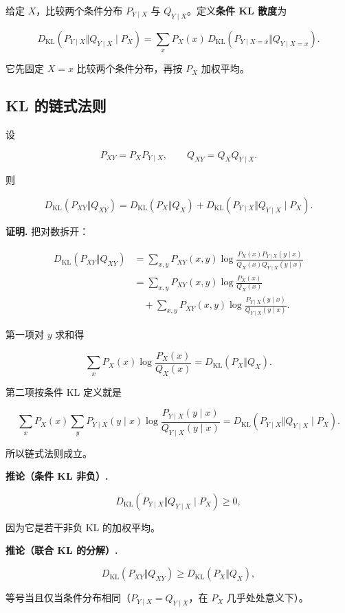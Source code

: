 给定 $X$，比较两个条件分布 $P_{Y\mid X}$ 与 $Q_{Y\mid X}$。定义\textbf{条件 KL 散度}为

\[
D_{\mathrm{KL}}(P_{Y\mid X}\Vert Q_{Y\mid X}\mid P_X)
=\sum_xP_X(x)\,
D_{\mathrm{KL}}(P_{Y\mid X=x}\Vert Q_{Y\mid X=x}).
\]

它先固定 $X=x$ 比较两个条件分布，再按 $P_X$ 加权平均。

\subsection{KL 的链式法则}


设

\[
P_{XY}=P_XP_{Y\mid X},\qquad
Q_{XY}=Q_XQ_{Y\mid X}.
\]

则

\[
\boxed{
D_{\mathrm{KL}}(P_{XY}\Vert Q_{XY})
=D_{\mathrm{KL}}(P_X\Vert Q_X)
+D_{\mathrm{KL}}(P_{Y\mid X}\Vert Q_{Y\mid X}\mid P_X)
}.
\]

\textbf{证明.} 把对数拆开：

\[
\begin{aligned}
D_{\mathrm{KL}}(P_{XY}\Vert Q_{XY})
&=\sum_{x,y}P_{XY}(x,y)
\log\frac{P_X(x)P_{Y\mid X}(y\mid x)}
{Q_X(x)Q_{Y\mid X}(y\mid x)}\\
&=\sum_{x,y}P_{XY}(x,y)\log\frac{P_X(x)}{Q_X(x)}\\
&\quad+\sum_{x,y}P_{XY}(x,y)
\log\frac{P_{Y\mid X}(y\mid x)}{Q_{Y\mid X}(y\mid x)}.
\end{aligned}
\]

第一项对 $y$ 求和得

\[
\sum_xP_X(x)\log\frac{P_X(x)}{Q_X(x)}
=D_{\mathrm{KL}}(P_X\Vert Q_X).
\]

第二项按条件 KL 定义就是

\[
\sum_xP_X(x)\sum_yP_{Y\mid X}(y\mid x)
\log\frac{P_{Y\mid X}(y\mid x)}{Q_{Y\mid X}(y\mid x)}
=D_{\mathrm{KL}}(P_{Y\mid X}\Vert Q_{Y\mid X}\mid P_X).
\]

所以链式法则成立。

\textbf{推论（条件 KL 非负）.}

\[
D_{\mathrm{KL}}(P_{Y\mid X}\Vert Q_{Y\mid X}\mid P_X)\ge0,
\]

因为它是若干非负 KL 的加权平均。

\textbf{推论（联合 KL 的分解）.}

\[
D_{\mathrm{KL}}(P_{XY}\Vert Q_{XY})
\ge D_{\mathrm{KL}}(P_X\Vert Q_X),
\]

等号当且仅当条件分布相同（$P_{Y\mid X}=Q_{Y\mid X}$，在 $P_X$ 几乎处处意义下）。


